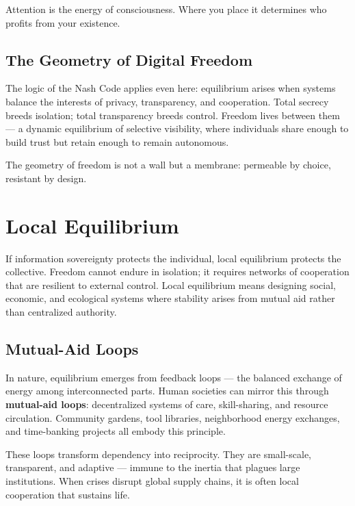 \documentclass[12pt,twoside]{book}
\begin{document}
\begin{keyidea}
Attention is the energy of consciousness.  
Where you place it determines who profits from your existence.
\end{keyidea}

\subsection*{The Geometry of Digital Freedom}

The logic of the Nash Code applies even here: equilibrium arises when systems balance the interests of privacy, transparency, and cooperation.  
Total secrecy breeds isolation; total transparency breeds control.  
Freedom lives between them --- a dynamic equilibrium of selective visibility, where individuals share enough to build trust but retain enough to remain autonomous.\\

\begin{keyidea}
The geometry of freedom is not a wall but a membrane: permeable by choice, resistant by design.
\end{keyidea}

\section{Local Equilibrium}

If information sovereignty protects the individual, local equilibrium protects the collective.  
Freedom cannot endure in isolation; it requires networks of cooperation that are resilient to external control.  
Local equilibrium means designing social, economic, and ecological systems where stability arises from mutual aid rather than centralized authority.

\subsection*{Mutual-Aid Loops}

In nature, equilibrium emerges from feedback loops --- the balanced exchange of energy among interconnected parts.  
Human societies can mirror this through \textbf{mutual-aid loops}: decentralized systems of care, skill-sharing, and resource circulation.  
Community gardens, tool libraries, neighborhood energy exchanges, and time-banking projects all embody this principle.  

These loops transform dependency into reciprocity.  
They are small-scale, transparent, and adaptive --- immune to the inertia that plagues large institutions.  
When crises disrupt global supply chains, it is often local cooperation that sustains life.\\
\end{document}
